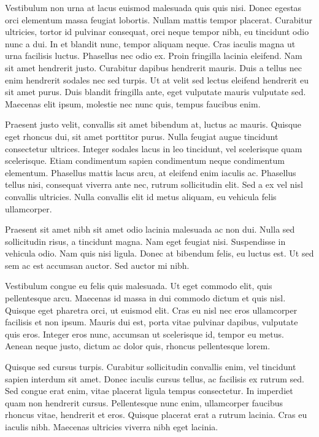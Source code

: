 Vestibulum non urna at lacus euismod malesuada quis quis nisi. Donec egestas orci elementum massa feugiat lobortis. Nullam mattis tempor placerat. Curabitur ultricies, tortor id pulvinar consequat, orci neque tempor nibh, eu tincidunt odio nunc a dui. In et blandit nunc, tempor aliquam neque. Cras iaculis magna ut urna facilisis luctus. Phasellus nec odio ex. Proin fringilla lacinia eleifend. Nam sit amet hendrerit justo. Curabitur dapibus hendrerit mauris. Duis a tellus nec enim hendrerit sodales nec sed turpis. Ut at velit sed lectus eleifend hendrerit eu sit amet purus. Duis blandit fringilla ante, eget vulputate mauris vulputate sed. Maecenas elit ipsum, molestie nec nunc quis, tempus faucibus enim.

Praesent justo velit, convallis sit amet bibendum at, luctus ac mauris. Quisque eget rhoncus dui, sit amet porttitor purus. Nulla feugiat augue tincidunt consectetur ultrices. Integer sodales lacus in leo tincidunt, vel scelerisque quam scelerisque. Etiam condimentum sapien condimentum neque condimentum elementum. Phasellus mattis lacus arcu, at eleifend enim iaculis ac. Phasellus tellus nisi, consequat viverra ante nec, rutrum sollicitudin elit. Sed a ex vel nisl convallis ultricies. Nulla convallis elit id metus aliquam, eu vehicula felis ullamcorper.

Praesent sit amet nibh sit amet odio lacinia malesuada ac non dui. Nulla sed sollicitudin risus, a tincidunt magna. Nam eget feugiat nisi. Suspendisse in vehicula odio. Nam quis nisi ligula. Donec at bibendum felis, eu luctus est. Ut sed sem ac est accumsan auctor. Sed auctor mi nibh.

Vestibulum congue eu felis quis malesuada. Ut eget commodo elit, quis pellentesque arcu. Maecenas id massa in dui commodo dictum et quis nisl. Quisque eget pharetra orci, ut euismod elit. Cras eu nisl nec eros ullamcorper facilisis et non ipsum. Mauris dui est, porta vitae pulvinar dapibus, vulputate quis eros. Integer eros nunc, accumsan ut scelerisque id, tempor eu metus. Aenean neque justo, dictum ac dolor quis, rhoncus pellentesque lorem.

Quisque sed cursus turpis. Curabitur sollicitudin convallis enim, vel tincidunt sapien interdum sit amet. Donec iaculis cursus tellus, ac facilisis ex rutrum sed. Sed congue erat enim, vitae placerat ligula tempus consectetur. In imperdiet quam non hendrerit cursus. Pellentesque nunc enim, ullamcorper faucibus rhoncus vitae, hendrerit et eros. Quisque placerat erat a rutrum lacinia. Cras eu iaculis nibh. Maecenas ultricies viverra nibh eget lacinia.

